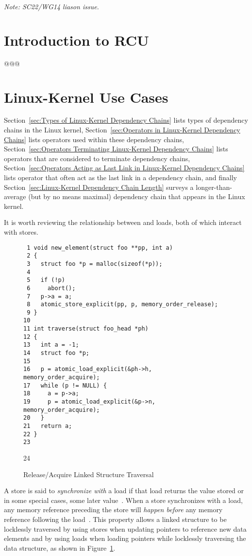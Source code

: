\documentclass[letterpaper,twocolumn,10pt]{article}
\begin{document}
\emph{Note: SC22/WG14 liason issue.}

\section{Introduction to RCU}
\label{sec:Introduction to RCU}

@@@

\section{Linux-Kernel Use Cases}
\label{sec:Linux-Kernel Use Cases}

Section~\ref{sec:Types of Linux-Kernel Dependency Chains}
lists types of dependency chains in the Linux kernel,
Section~\ref{sec:Operators in Linux-Kernel Dependency Chains}
lists operators used within these dependency chains,
Section~\ref{sec:Operators Terminating Linux-Kernel Dependency Chains}
lists operators that are considered to terminate dependency chains,
Section~\ref{sec:Operators Acting as Last Link in Linux-Kernel Dependency Chains}
lists operator that often act as the last link in a dependency chain,
and finally
Section~\ref{sec:Linux-Kernel Dependency Chain Length}
surveys a longer-than-average (but by no means maximal) dependency chain
that appears in the Linux kernel.

It is worth reviewing the relationship between 
and  loads, both of which interact with
 stores.

\begin{figure}[tbp]
{ \scriptsize
\begin{verbatim}
 1 void new_element(struct foo **pp, int a)
 2 {
 3   struct foo *p = malloc(sizeof(*p));
 4 
 5   if (!p)
 6     abort();
 7   p->a = a;
 8   atomic_store_explicit(pp, p, memory_order_release);
 9 }
10 
11 int traverse(struct foo_head *ph)
12 {
13   int a = -1;
14   struct foo *p;
15 
16   p = atomic_load_explicit(&ph->h, memory_order_acquire);
17   while (p != NULL) {
18     a = p->a;
19     p = atomic_load_explicit(&p->n, memory_order_acquire);
20   }
21   return a;
22 }
23 \end{verbatim}
24 }
\caption{Release/Acquire Linked Structure Traversal}
\label{fig:Release/Acquire Linked Structure Traversal}
\end{figure}

A  store is said to \emph{synchronize with}
a  load if that load returns the value stored
or in some special cases, some later
value~\cite[1.10p9-1.10p10]{RichardSmith2015N4527}.
When a  store synchronizes with a
 load, any memory reference preceding the
 store will \emph{happen before}
any memory reference following the
 load~\cite[1.10p13-1.10p14]{RichardSmith2015N4527}.
This property allows a linked structure to be locklessly traversed
by using  stores when updating pointers to
reference new data elements and by using 
loads when loading pointers while locklessly traversing the data
structure, as shown in
Figure~\ref{fig:Release/Acquire Linked Structure Traversal}.
\end{document}
